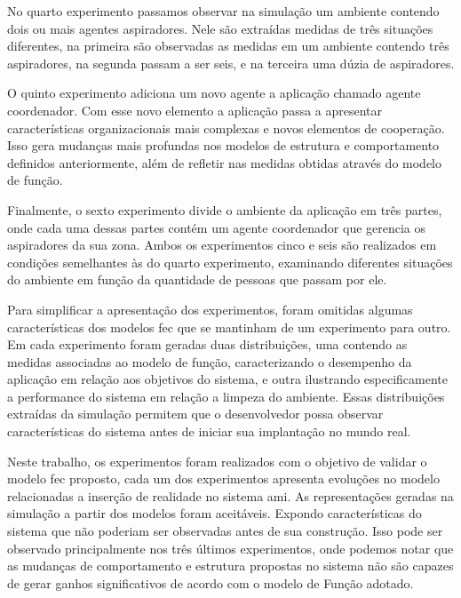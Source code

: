 No quarto experimento passamos observar na simulação um ambiente contendo dois ou mais agentes aspiradores. Nele são extraídas medidas de três situações diferentes, na primeira são observadas as medidas em um ambiente contendo três aspiradores, na segunda passam a ser seis, e na terceira uma dúzia de aspiradores. 

O quinto experimento adiciona um novo agente a aplicação chamado agente coordenador. Com esse novo elemento a aplicação passa a apresentar características organizacionais mais complexas e novos elementos de cooperação. Isso gera mudanças mais profundas nos modelos de estrutura e comportamento definidos anteriormente, além de refletir nas medidas obtidas através do modelo de função.

Finalmente, o sexto experimento divide o ambiente da aplicação em três partes, onde cada uma dessas partes contém um agente coordenador que gerencia os aspiradores da sua zona.  Ambos os experimentos cinco e seis são realizados em condições semelhantes às do quarto experimento, examinando diferentes situações do ambiente em função da quantidade de pessoas que passam por ele. 

Para simplificar a apresentação dos experimentos, foram omitidas algumas características dos modelos \acrshort{fec} que se mantinham de um experimento para outro. Em cada experimento foram geradas duas distribuições, uma contendo as medidas associadas ao modelo de função, caracterizando o desempenho da aplicação em relação aos objetivos do sistema, e outra ilustrando especificamente a performance do sistema em relação a limpeza do ambiente. Essas distribuições extraídas da simulação permitem que o desenvolvedor possa observar características do sistema antes de iniciar sua implantação no mundo real.

Neste trabalho, os experimentos foram realizados com o objetivo de validar o modelo \acrshort{fec} proposto, cada um dos experimentos apresenta evoluções no modelo relacionadas a inserção de realidade no sistema \acrshort{ami}. As representações geradas na simulação a partir dos modelos foram aceitáveis. Expondo características do sistema que não poderiam ser observadas antes de sua construção. Isso pode ser observado principalmente nos três últimos experimentos, onde podemos notar que as mudanças de comportamento e estrutura propostas no sistema não são capazes de gerar ganhos significativos de acordo com o modelo de Função adotado.



